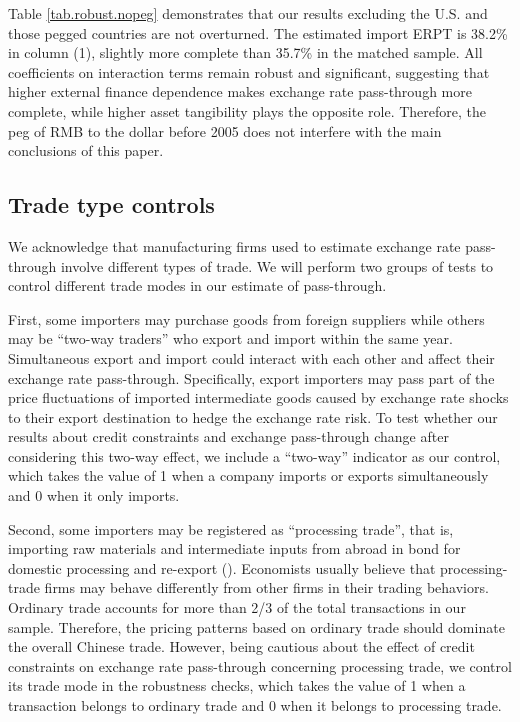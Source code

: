 Table \ref{tab.robust.nopeg} demonstrates that our results excluding the U.S. and those pegged countries are not overturned. The estimated import ERPT is 38.2\% in column (1), slightly more complete than 35.7\% in the matched sample. All coefficients on interaction terms remain robust and significant, suggesting that higher external finance dependence makes exchange rate pass-through more complete, while higher asset tangibility plays the opposite role. Therefore, the peg of RMB to the dollar before 2005 does not interfere with the main conclusions of this paper.

\subsection{Trade type controls}

We acknowledge that manufacturing firms used to estimate exchange rate pass-through involve different types of trade. We will perform two groups of tests to control different trade modes in our estimate of pass-through.

First, some importers may purchase goods from foreign suppliers while others may be ``two-way traders'' who export and import within the same year. Simultaneous export and import could interact with each other and affect their exchange rate pass-through. Specifically, export importers may pass part of the price fluctuations of imported intermediate goods caused by exchange rate shocks to their export destination to hedge the exchange rate risk. To test whether our results about credit constraints and exchange pass-through change after considering this two-way effect, we include a ``two-way'' indicator as our control, which takes the value of 1 when a company imports or exports simultaneously and 0 when it only imports.

Second, some importers may be registered as ``processing trade'', that is, importing raw materials and intermediate inputs from abroad in bond for domestic processing and re-export (\cite{manova-yu2016}). Economists usually believe that processing-trade firms may behave differently from other firms in their trading behaviors. Ordinary trade accounts for more than 2/3 of the total transactions in our sample. Therefore, the pricing patterns based on ordinary trade should dominate the overall Chinese trade. However, being cautious about the effect of credit constraints on exchange rate pass-through concerning processing trade, we control its trade mode in the robustness checks, which takes the value of 1 when a transaction belongs to ordinary trade and 0 when it belongs to processing trade.

